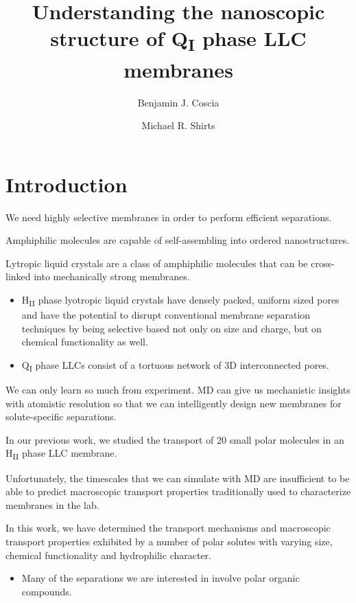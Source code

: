\documentclass{article}
\title{Understanding the nanoscopic structure of Q\textsubscript{I} phase LLC membranes}
\author{Benjamin J. Coscia \and Michael R. Shirts}
\begin{document}
  \graphicspath{{./figures/}}
  \maketitle

  \section{Introduction}

  We need highly selective membranes in order to perform efficient separations.

  Amphiphilic molecules are capable of self-assembling into ordered nanostructures.

  Lytropic liquid crystals are a class of amphiphilic molecules that can be cross-linked
  into mechanically strong membranes.
  \begin{itemize}
  	\item H\textsubscript{II} phase lyotropic liquid crystals have densely packed, uniform
	sized pores and have the potential to disrupt conventional membrane separation
	techniques by being selective based not only on size and charge, but on chemical
	functionality as well.
	\item Q\textsubscript{I} phase LLCs consist of a tortuous network of 3D interconnected
	pores.
  \end{itemize}

  We can only learn so much from experiment. MD can give us mechanistic insights with
  atomistic resolution so that we can intelligently design new membranes for 
  solute-specific separations.

  In our previous work, we studied the transport of 20 small polar molecules
  in an H\textsubscript{II} phase LLC membrane. 

  Unfortunately, the timescales that we can simulate with MD are insufficient to be
  able to predict macroscopic transport properties traditionally used to characterize
  membranes in the lab.


  In this work, we have determined the transport mechanisms and macroscopic
  transport properties exhibited by a number of polar solutes with varying size,
  chemical functionality and hydrophilic character.
  \begin{itemize}
	\item Many of the separations we are interested in involve polar organic 
	compounds.
  \end{itemize} 
\end{document}
